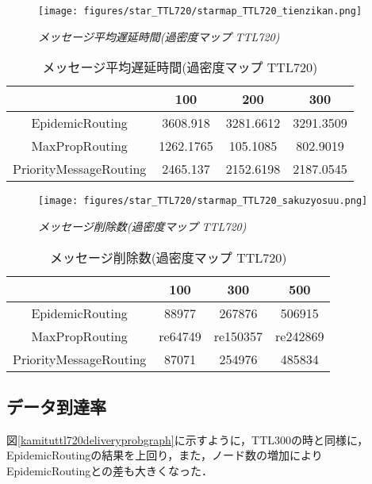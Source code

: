 \documentclass[11pt]{icsthesis}
\begin{document}
\newpage

\begin{figure}[h]
\centering
\texttt{[image: figures/star\_TTL720/starmap\_TTL720\_tienzikan.png]}
\caption[]{\it{メッセージ平均遅延時間(過密度マップ TTL720)}}
\label{kamituttl720latencyavggraph}
\end{figure}

\begin{table}[H]
	\begin{center}
      \caption[]{メッセージ平均遅延時間(過密度マップ TTL720)}
      \label{kamituttl720latencyavg}
      \begin{tabular}{|c|c|c|c|}
				\hline
				&100&200&300\\
				\hline
				EpidemicRouting&3608.918&3281.6612&3291.3509\\
				\hline
				MaxPropRouting&1262.1765&105.1085&802.9019\\
				\hline
				PriorityMessageRouting&2465.137&2152.6198&2187.0545\\
				\hline
			\end{tabular}
			\end{center}
\end{table}

\begin{figure}[h]
\centering
\texttt{[image: figures/star\_TTL720/starmap\_TTL720\_sakuzyosuu.png]}
\caption[]{\it{メッセージ削除数(過密度マップ TTL720)}}
\label{kamituttl720droppedgraph}
\end{figure}

\begin{table}[H]
 \begin{center}
      \caption[]{メッセージ削除数(過密度マップ TTL720)}
      \label{kamituttl720dropped}
      \begin{tabular}{|c|c|c|c|}
\hline
&100&300&500\\
\hline
EpidemicRouting&88977&267876&506915\\
\hline
MaxPropRouting&re64749&re150357&re242869\\
\hline
PriorityMessageRouting&87071&254976&485834\\
\hline
      \end{tabular}
    \end{center}
\end{table}
\subsection{データ到達率}
図\ref{kamituttl720deliveryprobgraph}に示すように，TTL300の時と同様に，EpidemicRoutingの結果を上回り，また，ノード数の増加によりEpidemicRoutingとの差も大きくなった．
\end{document}
